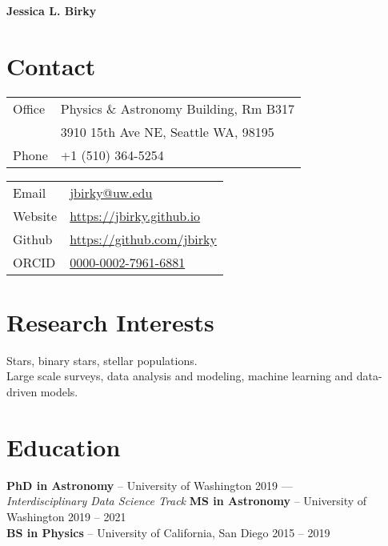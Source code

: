 \documentclass[margin,line]{resume}
\begin{document}
{\sc \textbf{\Large Jessica L. Birky}} 
\vspace{0.3cm}
\begin{resume}

 
\section{\mysidestyle \textcolor{bcolor}{Contact}}

\noindent\begin{multicols}{2}\small
\noindent\begin{tabular}{@{}l|l}
  \multirow{1}{*}{Office}   & Physics \& Astronomy Building, Rm B317  \\
  \multirow{1}{*}{}         & 3910 15th Ave NE, Seattle WA, 98195  \\
  \multirow{1}{*}{Phone}    & +1 (510) 364-5254 \\
\end{tabular}

\noindent\begin{tabular}{@{}l|l}
  \multirow{1}{*}{Email}    &   \href{jbirky@ucsd.edu}{jbirky@uw.edu} \\
  \multirow{1}{*}{Website}  &   \href{https://jbirky.github.io/}{https://jbirky.github.io} \\
  \multirow{1}{*}{Github}   &   \href{https://github.com/jbirky}{https://github.com/jbirky} \\
  \multirow{1}{*}{ORCID}    &   \href{https://orcid.org/0000-0002-7961-6881}{0000-0002-7961-6881} \\
\end{tabular} 
\end{multicols}


\section{\mysidestyle \textcolor{bcolor}{Research Interests}}
Stars, binary stars, stellar populations. \\
Large scale surveys, data analysis and modeling, machine learning and data-driven models. 
 
       
\section{\mysidestyle \textcolor{bcolor}{Education}}
\textbf{PhD in Astronomy} -- University of Washington  \hfill 2019 --- \\
\textsl{Interdisciplinary Data Science Track} \vspace{.1cm} \newline
\textbf{MS in Astronomy} -- University of Washington  \hfill 2019 -- 2021 \\
\textbf{BS in Physics} -- University of California, San Diego \hfill 2015 -- 2019 


\end{resume}
\end{document}
